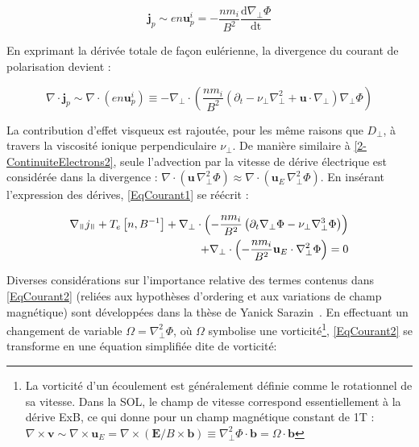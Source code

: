\begin{refsection}
\begin{equation}
\mathbf{j}_p\sim
en\mathbf{u}^i_p=-\frac{nm_{i}}{B^2}\frac{\text{d}\nabla_\perp \Phi}{\text{dt}}
\end{equation}

En exprimant la dérivée totale de
façon eulérienne, la divergence du courant de polarisation devient :

\begin{equation}
\nabla\cdot\mathbf{j}_p\sim\nabla\cdot\left({e}n\mathbf{u}^i_p\right)\equiv
-\nabla_\perp\cdot\left(\frac{nm_{i}}{B^2}\left(\partial_{t} -
\nu_\perp \nabla_\perp^2 +
\mathbf{u}\cdot\nabla_\perp\right)\nabla_\perp \Phi\right)
\end{equation}

La contribution d'effet visqueux est rajoutée, pour les même raisons que
$D_\perp$, à travers la viscosité ionique perpendiculaire $\nu_\perp$.
De manière similaire à \eqref{2-ContinuiteElectrons2}, seule l'advection par la
vitesse de dérive électrique est considérée dans la divergence : 
$\nabla\cdot\left(\mathbf{u}\,\nabla_\perp^2 \Phi\right)
\approx\nabla\cdot\left(\mathbf{u}_E\,\nabla_\perp^2 \Phi\right)$.
En insérant l'expression des dérives, \eqref{EqCourant1} se réécrit :

\begin{equation}\begin{split}
\label{EqCourant2}
\nabla_\para j_\para +
T_e\left[n,B\puissance{-1}\right] +
\nabla_\perp\cdot\left(-\frac{nm_{i}}{B^2}\left(\partial_{t}\nabla_\perp \Phi - \nu_\perp \nabla_\perp^3 \Phi \right)\right) \\+
\nabla_\perp\cdot\left(-\frac{nm_{i}}{B^2}\mathbf{u}_E\cdot\nabla_\perp^2
\Phi\right)=0
\end{split}
\end{equation}

Diverses considérations sur l'importance relative des termes contenus dans
\eqref{EqCourant2} (reliées aux hypothèses d'ordering
et aux variations de champ magnétique) sont développées dans la thèse de Yanick
Sarazin~\cite{SarazinPhD}. En effectuant un changement de variable
$\Omega=\nabla_\perp^2\Phi$, où $\Omega$ symbolise une vorticité\footnote{La
vorticité d'un écoulement est généralement définie comme le rotationnel de sa vitesse. Dans la SOL, le champ de vitesse correspond essentiellement à la dérive ExB, ce qui donne pour un champ magnétique constant de 1T : 
$\nabla\times\mathbf{v}\sim\nabla\times\mathbf{u}_E=\nabla\times(\mathbf{E}/B\times\mathbf{b})\equiv\nabla_\perp^2\Phi\cdot\mathbf
b=\Omega\cdot\mathbf
b$ }, \eqref{EqCourant2} se transforme en une équation simplifiée
dite de vorticité:


\end{refsection}
